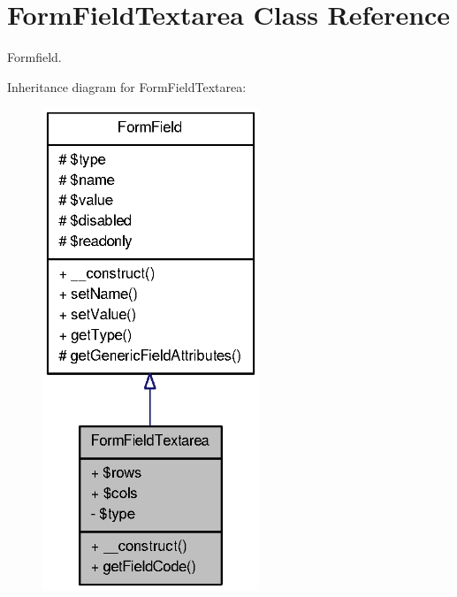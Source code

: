 \section{FormFieldTextarea Class Reference}
\label{classFormFieldTextarea}


Formfield.  




Inheritance diagram for FormFieldTextarea:\nopagebreak
\begin{figure}[H]
\begin{center}
\leavevmode
\includegraphics[width=184pt]{classFormFieldTextarea__inherit__graph}
\end{center}
\end{figure}


